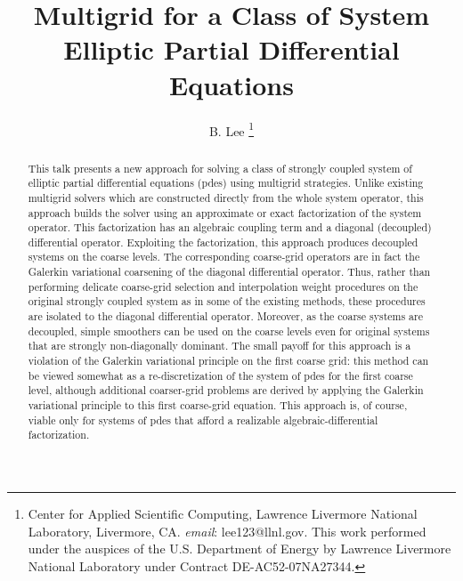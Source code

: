 \documentclass[10pt]{siamltex}
\begin{document}
\title{Multigrid for a Class of System Elliptic Partial Differential Equations}
\author{B. Lee
\thanks{Center for Applied Scientific Computing, Lawrence Livermore National Laboratory,
Livermore, CA. {\it email}: lee123@llnl.gov. This work performed under the auspices of the U.S. Department
of Energy by Lawrence Livermore National Laboratory under Contract DE-AC52-07NA27344.}}
\date{}
\maketitle

\begin{abstract}
This talk presents a new approach for solving a class of strongly coupled system of elliptic partial
differential equations (pdes) using multigrid strategies. Unlike existing
multigrid solvers which are constructed directly from the whole system
operator, this approach builds the solver using an approximate or exact factorization of the
system operator. This factorization has an algebraic coupling term and a diagonal 
(decoupled) differential operator. Exploiting the factorization,
this approach produces decoupled systems on the coarse levels. The corresponding coarse-grid
operators are in fact the Galerkin variational coarsening of the diagonal differential operator.
Thus, rather than performing delicate coarse-grid selection and interpolation weight procedures on the
original strongly coupled system as in some of the existing methods, these procedures are isolated 
to the diagonal differential operator. Moreover, as the coarse systems are decoupled,
simple smoothers can be used on the coarse levels even for original systems
that are strongly non-diagonally dominant. The small payoff for this approach is
a violation of the Galerkin variational principle on the first coarse grid:
this method can be viewed somewhat as a re-discretization of the system of
pdes for the first coarse level, although additional coarser-grid problems are derived
by applying the Galerkin variational principle to this first coarse-grid equation. This approach is, 
of course, viable only for systems of pdes that afford a realizable algebraic-differential factorization.
\end{abstract}
\end{document}
